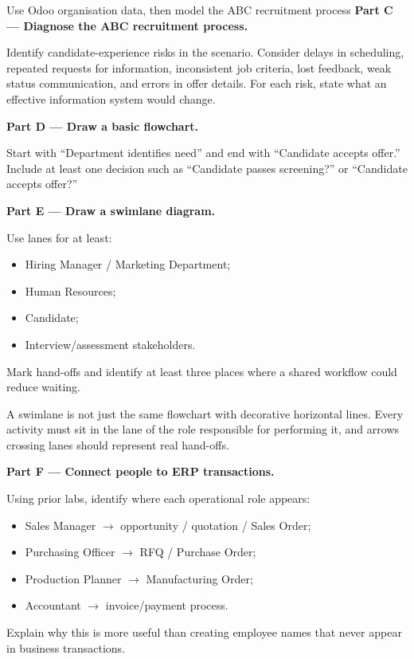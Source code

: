 \begin{labproject}{Use Odoo organisation data, then model the ABC recruitment process}
\medskip\noindent\textbf{Part C --- Diagnose the ABC recruitment process.}

Identify candidate-experience risks in the scenario. Consider delays in scheduling, repeated requests for information, inconsistent job criteria, lost feedback, weak status communication, and errors in offer details. For each risk, state what an effective information system would change.

\medskip\noindent\textbf{Part D --- Draw a basic flowchart.}

Start with ``Department identifies need'' and end with ``Candidate accepts offer.'' Include at least one decision such as ``Candidate passes screening?'' or ``Candidate accepts offer?''

\medskip\noindent\textbf{Part E --- Draw a swimlane diagram.}

Use lanes for at least:
\begin{itemize}
  \item Hiring Manager / Marketing Department;
  \item Human Resources;
  \item Candidate;
  \item Interview/assessment stakeholders.
\end{itemize}

Mark hand-offs and identify at least three places where a shared workflow could reduce waiting.

\begin{pitfall}
A swimlane is not just the same flowchart with decorative horizontal lines. Every activity must sit in the lane of the role responsible for performing it, and arrows crossing lanes should represent real hand-offs.
\end{pitfall}

\medskip\noindent\textbf{Part F --- Connect people to ERP transactions.}

Using prior labs, identify where each operational role appears:
\begin{itemize}
  \item Sales Manager $\rightarrow$ opportunity / quotation / Sales Order;
  \item Purchasing Officer $\rightarrow$ RFQ / Purchase Order;
  \item Production Planner $\rightarrow$ Manufacturing Order;
  \item Accountant $\rightarrow$ invoice/payment process.
\end{itemize}

Explain why this is more useful than creating employee names that never appear in business transactions.
\end{labproject}

